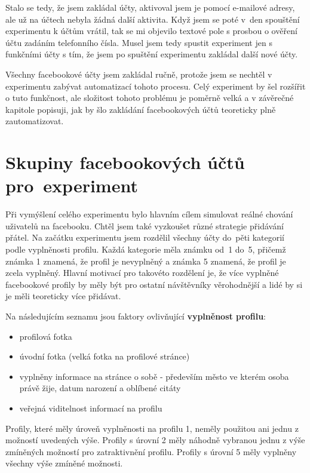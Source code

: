 \documentclass[thesis=M,czech]{FITthesis}[2013/05/10]
\begin{document}
Stalo se tedy, že jsem zakládal účty, aktivoval jsem je pomocí e-mailové adresy, ale už na účtech nebyla žádná další aktivita. Když jsem se poté v~den spouštění experimentu k účtům vrátil, tak se mi objevilo textové pole s prosbou o ověření účtu zadáním telefonního čísla. Musel jsem tedy spustit experiment jen s funkčními účty s tím, že jsem po spuštění experimentu zakládal další nové účty.

Všechny facebookové účty jsem zakládal ručně, protože jsem se nechtěl v experimentu zabývat automatizací tohoto procesu. Celý experiment by šel rozšířit o tuto funkčnost, ale složitost tohoto problému je poměrně velká a v závěrečné kapitole popisuji, jak by šlo zakládání facebookových účtů teoreticky plně zautomatizovat.

\section{Skupiny facebookových účtů pro~experiment}

Při vymýšlení celého experimentu bylo hlavním cílem simulovat reálné chování uživatelů na facebooku. Chtěl jsem také vyzkoušet různé strategie přidávání přátel. Na začátku experimentu jsem rozdělil všechny účty do~pěti kategorií podle vyplněnosti profilu. Každá kategorie měla známku od~1 do~5, přičemž známka 1 znamená, že profil je nevyplněný a známka 5 znamená, že profil je zcela vyplněný. Hlavní motivací pro takovéto rozdělení je, že více vyplněné facebookové profily by měly být pro ostatní návštěvníky věrohodnější a lidé by si je měli teoreticky více přidávat.

Na následujícím seznamu jsou faktory ovlivňující \textbf{vyplněnost profilu}:

\begin{itemize}
  \item profilová fotka
  \item úvodní fotka (velká fotka na profilové stránce)
  \item vyplněny informace na stránce o sobě - především město ve kterém osoba právě žije, datum narození a oblíbené citáty
  \item veřejná viditelnost informací na profilu
\end{itemize}

Profily, které měly úroveň vyplněnosti na profilu 1, neměly použitou ani jednu z možností uvedených výše. Profily s úrovní 2 měly náhodně vybranou jednu z výše zmíněných možností pro zatraktivnění profilu. Profily s úrovní 5 měly vyplněny všechny výše zmíněné možnosti.
\end{document}
